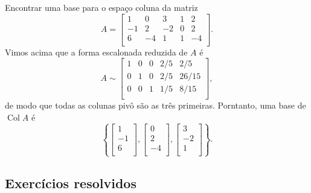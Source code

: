 \begin{ex}
	Encontrar uma base para o espaço coluna da matriz
	\begin{equation}
	A = \left[
	\begin{array}{ccccc}
	1  & 0  & 3   & 1 & 2 \\
	-1 & 2  & -2  & 0 & 2 \\
	6  & -4 & 1   & 1 & -4 \\
	\end{array}
	\right].
	\end{equation} Vimos acima que a forma escalonada reduzida de $A$ é
	\begin{equation}
	A \sim
	\left[
	\begin{array}{ccccc}
	1  & 0  & 0  & 2/5 & 2/5  \\
	0  & 1  & 0  & 2/5 & 26/15  \\
	0  & 0  & 1  & 1/5 & 8/15 \\
	\end{array}
	\right],
	\end{equation} de modo que todas as colunas pivô são as três primeiras. Porntanto, uma base de $\operatorname{Col} A$ é
	\begin{equation}
	\left\{
	\left[
	\begin{array}{c}
	1    \\
	-1  \\
	6    \\
	\end{array}
	\right],
	\left[
	\begin{array}{c}
	0   \\
	2   \\
	-4   \\
	\end{array}
	\right],
	\left[
	\begin{array}{c}
	3  \\
	-2 \\
	1  \\
	\end{array}
	\right]
	\right\}.
	\end{equation}
\end{ex}





\subsection*{Exercícios resolvidos}

\construirExeresol

